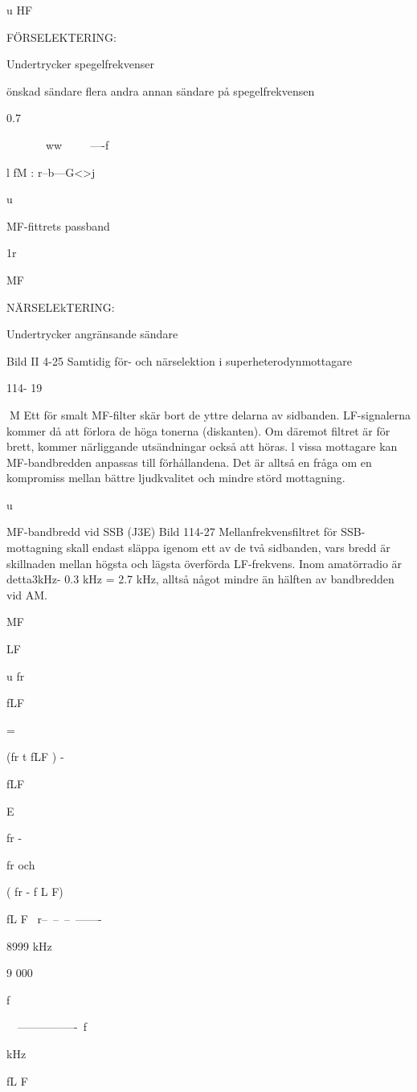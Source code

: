 u
HF

FÖRSELEKTERING:

Undertrycker spegelfrekvenser

önskad sändare
flera andra
annan sändare på
spegelfrekvensen

0.7

~~~~~~~ww~~~~~----f

l fM :
r--b---G<>j

u

MF-fittrets passband

1r

MF

NÄRSELEkTERING:

Undertrycker angränsande sändare

Bild II 4-25 Samtidig för- och närselektion i superheterodynmottagare

114- 19

M
Ett för smalt MF-filter skär bort de yttre
delarna av sidbanden. LF-signalerna kommer då att förlora de höga tonerna (diskanten). Om däremot filtret är för brett, kommer
närliggande utsändningar också att höras.
l vissa mottagare kan MF-bandbredden
anpassas till förhållandena. Det är alltså en
fråga om en kompromiss mellan bättre ljudkvalitet och mindre störd mottagning.

u

MF-bandbredd vid SSB (J3E)
Bild 114-27
Mellanfrekvensfiltret för SSB-mottagning
skall endast släppa igenom ett av de två
sidbanden, vars bredd är skillnaden mellan
högsta och lägsta överförda LF-frekvens.
Inom amatörradio är detta3kHz- 0.3 kHz =
2.7 kHz, alltså något mindre än hälften av
bandbredden vid AM.

MF

LF

u
fr

fLF

=

(fr t fLF ) -

fLF

E

fr -

fr och

( fr - f L F)

fL F
~r--~--~--~-------

8999
kHz

9 000

f

~~----------------~f

kHz

fL F

